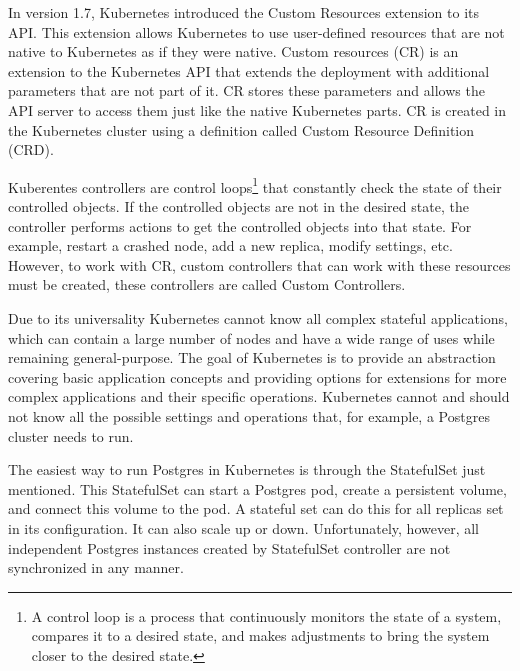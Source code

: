 In version 1.7, Kubernetes introduced the Custom Resources extension to its API. \cite{githubIBMCr} This extension allows Kubernetes to use user-defined resources that are not native to Kubernetes as if they were native. \cite{NewStackCRDs} Custom resources (CR) is an extension to the Kubernetes API that extends the deployment with additional parameters that are not part of it. CR stores these parameters and allows the API server to access them just like the native Kubernetes parts. CR is created in the Kubernetes cluster using a definition called Custom Resource Definition (CRD). \cite{operatorsAtK8sIface}

Kuberentes controllers are control loops\footnote[1]{A control loop is a process that continuously monitors the state of a system, compares it to a desired state, and makes adjustments to bring the system closer to the desired state.} that constantly check the state of their controlled objects. If the controlled objects are not in the desired state, the controller performs actions to get the controlled objects into that state. For example, restart a crashed node, add a new replica, modify settings, etc. \cite{docuKubeControllers}
However, to work with CR, custom controllers that can work with these resources must be created, these controllers are called Custom Controllers. \cite{docuKubeCR}



\label{chap:postgresInKube}
Due to its universality Kubernetes cannot know all complex stateful applications, which can contain a large number of nodes and have a wide range of uses while remaining general-purpose. The goal of Kubernetes is to provide an abstraction covering basic application concepts and providing options for extensions for more complex applications and their specific operations. Kubernetes cannot and should not know all the possible settings and operations that, for example, a Postgres cluster needs to run. \cite{operatorsTeaches}

The easiest way to run Postgres in Kubernetes is through the StatefulSet just mentioned. This StatefulSet can start a Postgres pod, create a persistent volume, and connect this volume to the pod. A stateful set can do this for all replicas set in its configuration. It can also scale up or down. Unfortunately, however, all independent Postgres instances created by StatefulSet controller are not synchronized in any manner.

